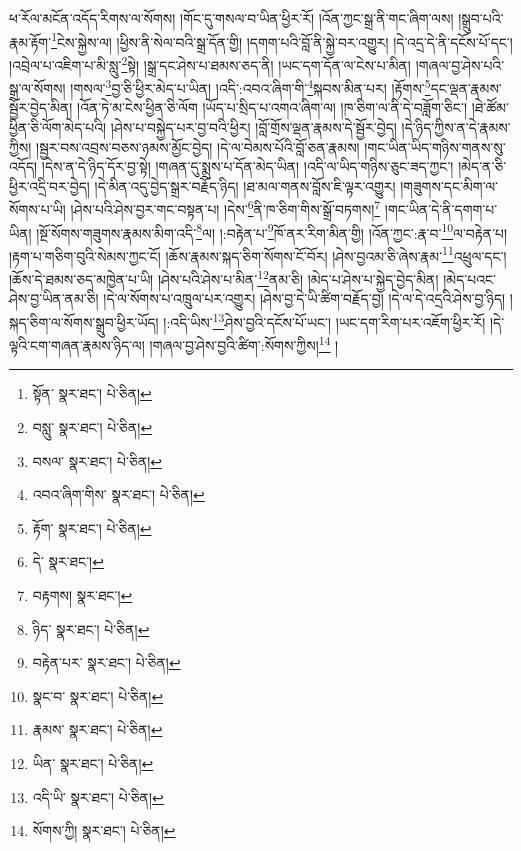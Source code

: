 ཕ་རོལ་མངོན་འདོད་རིགས་ལ་སོགས། །གོང་དུ་གསལ་བ་ཡིན་ཕྱིར་རོ། །འོན་ཀྱང་སྒྲ་ནི་གང་ཞིག་ལས། །སྒྲུབ་པའི་རྣམ་རྟོག་\footnote{སྟོན་  སྣར་ཐང་།  པེ་ཅིན། }ངེས་སྐྱེས་ལ། །ཕྱིས་ནི་སེལ་བའི་སྒྲ་དོན་གྱི། །དགག་པའི་བློ་ནི་སྐྱེ་བར་འགྱུར། །དེ་འདྲ་དེ་ནི་དངོས་པོ་དང་། །འབྲེལ་པ་འཇིག་པ་མི་སླུ་\footnote{བསླུ་  སྣར་ཐང་།  པེ་ཅིན། }སྟེ། །སྒྲ་དང་ཤེས་པ་ཐམས་ཅད་ནི། །ཡང་དག་དོན་ལ་ངེས་པ་མིན། །གཞལ་བྱ་ཤེས་པའི་སྒྲ་ལ་སོགས། །གསལ་\footnote{བསལ་  སྣར་ཐང་།  པེ་ཅིན། }བྱ་ཅི་ཕྱིར་མེད་པ་ཡིན། །འདི་:འབའ་ཞིག་གི་\footnote{འབའ་ཞིག་གིས་  སྣར་ཐང་།  པེ་ཅིན། }སྐབས་མིན་པར། །རྟོགས་\footnote{རྟོག་  སྣར་ཐང་།  པེ་ཅིན། }དང་ལྡན་རྣམས་སྦྱོར་བྱེད་མིན། །འོན་ཏེ་མ་ངེས་ཕྱིན་ཅི་ལོག །ཡོད་པ་སྲིད་པ་འགའ་ཞིག་ལ། །ཁ་ཅིག་ལ་ནི་དེ་བཟློག་ཅིང་། །ཐེ་ཚོམ་ཕྱིན་ཅི་ལོག་མེད་པའི། །ཤེས་པ་བསྐྱེད་པར་བྱ་བའི་ཕྱིར། །བློ་གྲོས་ལྡན་རྣམས་དེ་སྦྱོར་བྱེད། །དེ་ཉིད་ཀྱིས་ན་དེ་རྣམས་ཀྱིས། །སྦྱར་བས་འབྲས་བཅས་ཉམས་མྱོང་བྱེད། །དེ་ལ་བེམས་པོའི་བློ་ཅན་རྣམས། །གང་ཡིན་ཡིད་གཉིས་གནས་སུ་འདོད། །དེས་ན་དེ་ཉིད་དོར་བྱ་སྟེ། །གཞན་དུ་སྨྲས་པ་དོན་མེད་ཡིན། །འདི་ལ་ཡིད་གཉིས་ཅུང་ཟད་ཀྱང་། །མེད་ན་ཅི་ཕྱིར་འདྲི་བར་བྱེད། །དེ་མིན་འདུ་བྱེད་སྒྲར་བརྗོད་ཉིད། །ཐ་མལ་གནས་བློས་ཇི་ལྟར་འགྱུར། །གཟུགས་དང་མིག་ལ་སོགས་པ་ཡི། །ཤེས་པའི་ཤེས་བྱར་གང་བསྟན་པ། །དེས་\footnote{དེ་  སྣར་ཐང་། }ནི་ཁ་ཅིག་གིས་སྒྲོ་བཏགས།\footnote{བརྟགས།  སྣར་ཐང་། } །གང་ཡིན་དེ་ནི་དགག་པ་ཡིན། །སྔོ་སོགས་གཟུགས་རྣམས་མིག་འདི་\footnote{ཉིད་  སྣར་ཐང་།  པེ་ཅིན། }ལ། །:བརྟེན་པ་\footnote{བརྟེན་པར་  སྣར་ཐང་།  པེ་ཅིན། }ཁོ་ནར་རིག་མིན་གྱི། །འོན་ཀྱང་:རྣ་བ་\footnote{སྣང་བ་  སྣར་ཐང་།  པེ་ཅིན། }ལ་བརྟེན་པ། །རྟག་པ་གཅིག་བུའི་སེམས་ཀྱང་ངོ། །ཆོས་རྣམས་སྐད་ཅིག་སོགས་ངོ་བོར། །ཤེས་བྱའམ་ཅི་ཞེས་རྣམ་\footnote{རྣམས་  སྣར་ཐང་།  པེ་ཅིན། }འཕྲུལ་དང་། །ཆོས་དེ་ཐམས་ཅད་མཁྱེན་པ་ཡི། །ཤེས་པའི་ཤེས་པ་མིན་\footnote{ཡིན་  སྣར་ཐང་།  པེ་ཅིན། }ནམ་ཅི། །མེད་པ་ཤེས་པ་སྐྱེད་བྱེད་མིན། །མེད་པའང་ཤེས་བྱ་ཡིན་ནམ་ཅི། །དེ་ལ་སོགས་པ་འཁྲུལ་པར་འགྱུར། །ཤེས་བྱ་དེ་ཡི་ཚིག་བརྗོད་བྱ། །དེ་ལ་དེ་འདྲའི་ཤེས་བྱ་ཉིད། །སྐད་ཅིག་ལ་སོགས་སྒྲུབ་ཕྱིར་ཡོད། །:འདི་ཡིས་\footnote{འདི་ཡི་  སྣར་ཐང་།  པེ་ཅིན། }ཤེས་བྱའི་དངོས་པོ་ཡང་། །ཡང་དག་རིག་པར་འཇོག་ཕྱིར་རོ། །དེ་ལྟའི་ངག་གཞན་རྣམས་ཉིད་ལ། །གཞལ་བྱ་ཤེས་བྱའི་ཚིག་:སོགས་ཀྱིས།\footnote{སོགས་ཀྱི།  སྣར་ཐང་།  པེ་ཅིན། } །
